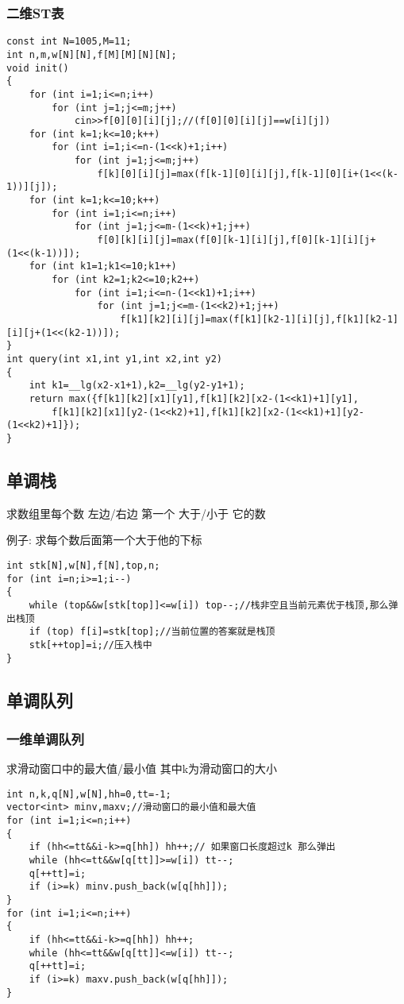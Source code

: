 \documentclass[a4paper]{ctexart}
\begin{document}
\subsubsection{二维ST表}
\begin{lstlisting}
const int N=1005,M=11;
int n,m,w[N][N],f[M][M][N][N];
void init()
{
    for (int i=1;i<=n;i++)
        for (int j=1;j<=m;j++)
            cin>>f[0][0][i][j];//(f[0][0][i][j]==w[i][j])
    for (int k=1;k<=10;k++)
        for (int i=1;i<=n-(1<<k)+1;i++)
            for (int j=1;j<=m;j++)
                f[k][0][i][j]=max(f[k-1][0][i][j],f[k-1][0][i+(1<<(k-1))][j]);
    for (int k=1;k<=10;k++)
        for (int i=1;i<=n;i++)
            for (int j=1;j<=m-(1<<k)+1;j++)
                f[0][k][i][j]=max(f[0][k-1][i][j],f[0][k-1][i][j+(1<<(k-1))]);
    for (int k1=1;k1<=10;k1++)
        for (int k2=1;k2<=10;k2++)
            for (int i=1;i<=n-(1<<k1)+1;i++)
                for (int j=1;j<=m-(1<<k2)+1;j++)
                    f[k1][k2][i][j]=max(f[k1][k2-1][i][j],f[k1][k2-1][i][j+(1<<(k2-1))]);
}
int query(int x1,int y1,int x2,int y2) 
{
    int k1=__lg(x2-x1+1),k2=__lg(y2-y1+1);
    return max({f[k1][k2][x1][y1],f[k1][k2][x2-(1<<k1)+1][y1],
        f[k1][k2][x1][y2-(1<<k2)+1],f[k1][k2][x2-(1<<k1)+1][y2-(1<<k2)+1]});
}
\end{lstlisting}

\subsection{单调栈}

求数组里每个数 \quad 左边/右边 \quad 第一个 \quad 大于/小于 \quad 它的数

例子: 求每个数后面第一个大于他的下标
\begin{lstlisting}
int stk[N],w[N],f[N],top,n;
for (int i=n;i>=1;i--)
{
    while (top&&w[stk[top]]<=w[i]) top--;//栈非空且当前元素优于栈顶,那么弹出栈顶
    if (top) f[i]=stk[top];//当前位置的答案就是栈顶
    stk[++top]=i;//压入栈中
}
\end{lstlisting}

\subsection{单调队列}

\subsubsection{一维单调队列}

求滑动窗口中的最大值/最小值 其中k为滑动窗口的大小
\begin{lstlisting}
int n,k,q[N],w[N],hh=0,tt=-1;
vector<int> minv,maxv;//滑动窗口的最小值和最大值
for (int i=1;i<=n;i++)
{
    if (hh<=tt&&i-k>=q[hh]) hh++;// 如果窗口长度超过k 那么弹出
    while (hh<=tt&&w[q[tt]]>=w[i]) tt--;
    q[++tt]=i;
    if (i>=k) minv.push_back(w[q[hh]]);
}
for (int i=1;i<=n;i++)
{
    if (hh<=tt&&i-k>=q[hh]) hh++;
    while (hh<=tt&&w[q[tt]]<=w[i]) tt--;
    q[++tt]=i;
    if (i>=k) maxv.push_back(w[q[hh]]);
}
\end{lstlisting}
\end{document}
